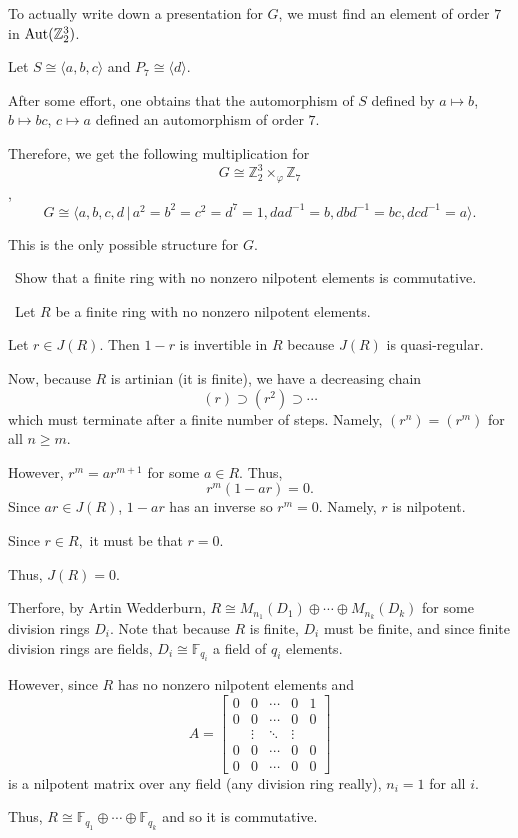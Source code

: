 \documentclass[12pt]{Qual}
\begin{document}
\begin{solution}
\begin{enumerate}[label=(\alph*)]
    To actually write down a presentation for $G$, we must find an element of order $7$ in $\text{Aut}(\mathbb{Z}_2^3)$.

    Let $S\cong\langle a,b,c\rangle$ and $P_7\cong\langle d\rangle.$

    After some effort, one obtains that the automorphism of $S$ defined by $a\mapsto b$, $b\mapsto bc$, $c\mapsto a$ defined an automorphism of order $7.$

    Therefore, we get the following multiplication for $$G\cong\mathbb{Z}_2^3\times_\varphi\mathbb{Z}_7$$, $$G\cong\langle a,b,c,d\,|\, a^2=b^2=c^2=d^7=1,dad^{-1}=b,dbd^{-1}=bc,dcd^{-1}=a\rangle.$$

    This is the only possible structure for $G.$
\end{enumerate}
\end{solution}
\newpage


\begin{problem} $\,$
Show that a finite ring with no nonzero nilpotent elements is commutative.
\end{problem}


\begin{solution}$\,$
Let $R$ be a finite ring with no nonzero nilpotent elements.

Let $r\in J(R)$. Then $1-r$ is invertible in $R$ because $J(R)$ is quasi-regular.

Now, because $R$ is artinian (it is finite), we have a decreasing chain $$(r)\supset(r^2)\supset\cdots$$ which must terminate after a finite number of steps. Namely, $(r^n)=(r^m)$ for all $n\ge m$.

However, $r^m=ar^{m+1}$ for some $a\in R$. Thus, $$r^m(1-ar)=0.$$ Since $ar\in J(R)$, $1-ar$ has an inverse so $r^m=0$. Namely, $r$ is nilpotent.

Since $r\in R,$ it must be that $r=0.$

Thus, $J(R)=0.$

Therfore, by Artin Wedderburn, $R\cong M_{n_1}(D_1)\oplus\cdots\oplus M_{n_k}(D_k)$ for some division rings $D_i.$ Note that because $R$ is finite, $D_i$ must be finite, and since finite division rings are fields, $D_i\cong\mathbb{F}_{q_i}$ a field of $q_i$ elements.

However, since $R$ has no nonzero nilpotent elements and $$A=\begin{bmatrix}
0 & 0 & \cdots & 0 & 1\\
0 & 0 &\cdots & 0 & 0\\
& \vdots & \ddots & \vdots & \\
0 & 0 & \cdots & 0 & 0\\
0 & 0 & \cdots & 0 & 0
\end{bmatrix}$$ is a nilpotent matrix over any field (any division ring really), $n_i=1$ for all $i.$

Thus, $R\cong \mathbb{F}_{q_1}\oplus\cdots\oplus \mathbb{F}_{q_k}$ and so it is commutative.
\end{solution}
\newpage
\end{document}

